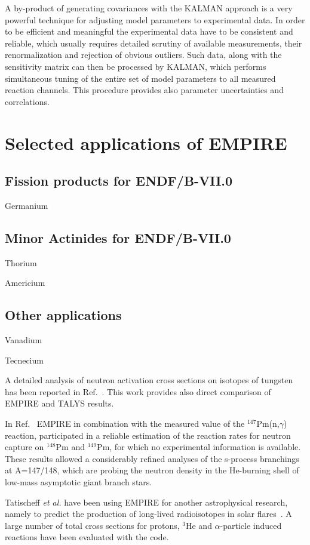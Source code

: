 \documentclass[twocolumn,amsmath,amssymb,10pt,groupedaddress,a4paper]{revtex4}
\begin{document}
A by-product of generating covariances with the KALMAN approach is a very powerful technique for adjusting model parameters to experimental data. In order to be efficient and meaningful the experimental data have to be consistent and reliable, which usually requires detailed scrutiny of available measurements, their renormalization and rejection of obvious outliers. Such data, along with the sensitivity matrix can then be processed by KALMAN, which performs simultaneous tuning of the entire set of model parameters to all measured reaction channels. This procedure provides also parameter uncertainties and correlations.


\section{Selected applications of EMPIRE}
\subsection{Fission products for ENDF/B-VII.0}
Germanium~\cite{iwamoto2005ncs}
\subsection{Minor Actinides for ENDF/B-VII.0}
Thorium~\cite{Sin:06}

Americium~\cite{Rochman:06a}
\subsection{Other applications}
Vanadium~\cite{Rochman:06b}

Tecnecium~\cite{Rochman:07c}

A detailed analysis of neutron activation cross sections on isotopes of tungsten has been reported in Ref.~\cite{Avrigeanu:06}. This work provides also direct comparison of EMPIRE and TALYS results.

In Ref.~\cite{reifarth2003snc} EMPIRE in combination
with the measured value of the $^{147}$Pm(n,$\gamma$) reaction, participated in a
reliable estimation of the reaction rates for neutron capture on $^{148}$Pm and $^{149}$Pm, for which no experimental information is available. These results allowed
a considerably refined analyses of the s-process branchings at A=147/148, which are probing the neutron density in the He-burning shell of low-mass asymptotic giant branch stars.

Tatischeff \textit{et al.} have been using EMPIRE for another astrophysical research, namely to predict the production of long-lived radioisotopes in solar flares~\cite{Tatischeff:06}. A large number of total cross sections for protons, $^3$He and $\alpha$-particle induced reactions have been evaluated with the code.
\end{document}
